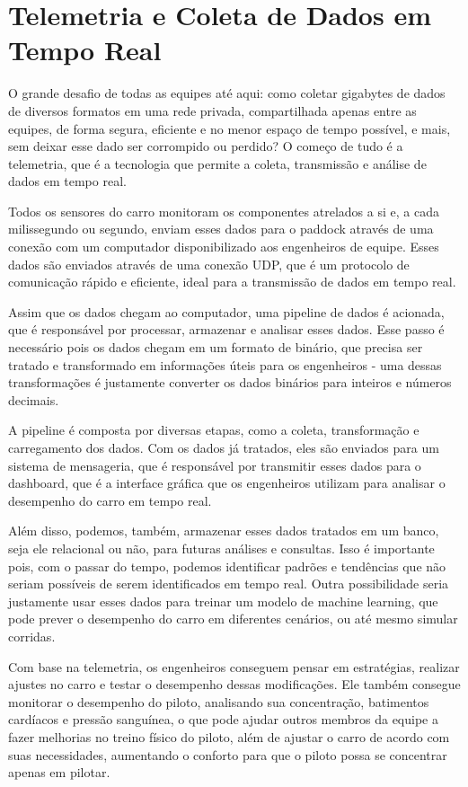 \documentclass[12pt, %
openright, 
oneside, %
a4paper,    %
brazil]{facom-ufu-abntex2}
\begin{document}
\section{Telemetria e Coleta de Dados em Tempo Real}
O grande desafio de todas as equipes até aqui: como coletar gigabytes de dados de diversos formatos em uma rede privada, compartilhada apenas
entre as equipes, de forma segura, eficiente e no menor espaço de tempo possível, e mais, sem deixar esse dado ser corrompido ou perdido? 
O começo de tudo é a telemetria, que é a tecnologia que permite a coleta, transmissão e análise de dados em tempo real.

Todos os sensores do carro monitoram os componentes atrelados a si e, a cada milissegundo ou segundo, enviam esses dados para o paddock através de uma conexão
com um computador disponibilizado aos engenheiros de equipe. Esses dados são enviados através de uma conexão UDP, que é um protocolo de comunicação rápido e 
eficiente, ideal para a transmissão de dados em tempo real.

Assim que os dados chegam ao computador, uma pipeline de dados é acionada, que é responsável por processar, armazenar e analisar esses dados. Esse passo é necessário
pois os dados chegam em um formato de binário, que precisa ser tratado e transformado em informações úteis para os engenheiros - uma dessas
transformações é justamente converter os dados binários para inteiros e números decimais. 

A pipeline é composta por diversas etapas, como a coleta, transformação e carregamento dos dados. Com os dados já tratados, eles são enviados para um sistema de mensageria,
que é responsável por transmitir esses dados para o dashboard, que é a interface gráfica que os engenheiros utilizam para analisar o desempenho do carro em tempo real.

Além disso, podemos, também, armazenar esses dados tratados em um banco, seja ele relacional ou não, para futuras análises e consultas. Isso é importante pois,
com o passar do tempo, podemos identificar padrões e tendências que não seriam possíveis de serem identificados em tempo real. Outra possibilidade seria justamente
usar esses dados para treinar um modelo de machine learning, que pode prever o desempenho do carro em diferentes cenários, ou até mesmo simular corridas.

Com base na telemetria, os engenheiros conseguem pensar em estratégias, realizar ajustes no carro e testar o desempenho dessas modificações.
Ele também consegue monitorar o desempenho do piloto, analisando sua concentração, batimentos cardíacos e pressão sanguínea, o que pode
ajudar outros membros da equipe a fazer melhorias no treino físico do piloto, além de ajustar o carro de acordo com suas necessidades, aumentando
o conforto para que o piloto possa se concentrar apenas em pilotar.
\end{document}
